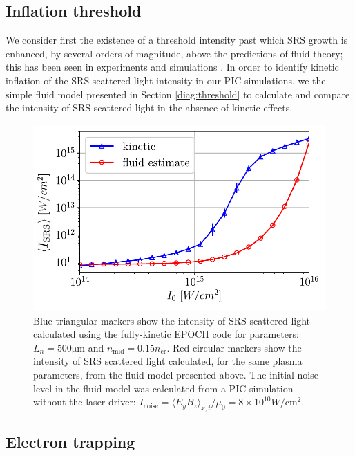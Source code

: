 \subsection{Inflation threshold}
We consider first the existence of  a threshold intensity past which SRS growth is enhanced, by several
orders of magnitude, above the predictions of fluid theory; this has been seen in experiments \cite{Kline2006} and simulations \cite{Vu2002,Yin2006,Vu2007,Riconda2011}. In order to identify kinetic inflation of the SRS scattered light intensity in our PIC simulations,
we the simple fluid model presented in Section \ref{diag:threshold} to calculate and compare the intensity of SRS scattered light in the absence of kinetic effects.

\begin{figure}[ht]
    \centering
    \includegraphics[width=0.8\columnwidth]{Chapters/C4_iSRS/fig2.pdf}
    \caption{
        Blue triangular markers show the intensity of SRS scattered light calculated using the fully-kinetic EPOCH code for parameters: $L_n = 500 \si{\micro\metre} $ and $n_{\mathrm{mid}} = 0.15n_\mathrm{cr}$.
        Red circular markers show the intensity of SRS scattered light calculated, for the same plasma parameters, from the fluid model presented above.
        The initial noise level in the fluid model was calculated from a PIC simulation without the laser driver: $I_\mathrm{noise}=\langle E_yB_z\rangle_{x,t} / \mu_0 = 8\times 10^{10} \si{W/\centi\metre^2}$.}
    \label{fig:kineticVsfluid}
\end{figure}{}

\subsection{Electron trapping}


